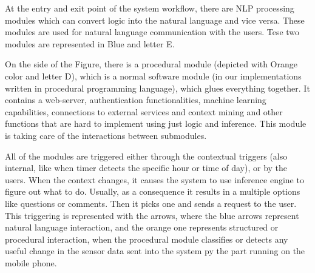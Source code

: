 At the entry and exit point of the system workflow, there are NLP processing  
modules which can convert logic into the natural language and vice versa. These
modules are used for natural language communication with the users. Tese two
modules are represented in Blue and letter E.

On the side of the Figure, there is a procedural module (depicted with Orange
color and letter D), which is a normal software module (in our implementations
written in procedural programming language), which glues everything together.
It contains a web-server, authentication functionalities, machine
learning capabilities, connections to external services and context mining
and other functions that are hard to implement using just logic and inference.
This module is taking care of the interactions between submodules. 

All of the modules are triggered either through the contextual triggers 
(also internal, like when timer detects the specific hour or time of day), or
by the users. When the context changes, it causes the system to use inference
engine to figure out what to do. Usually, as a consequence it results in a 
multiple options like questions or comments. Then it picks one and sends a 
request to the user. This triggering is represented with the arrows, where the 
blue arrows represent natural language interaction, and the orange one
represents structured or procedural interaction, when the procedural module
classifies or detects any useful change in the sensor data sent into the system
py the part running on the mobile phone.

